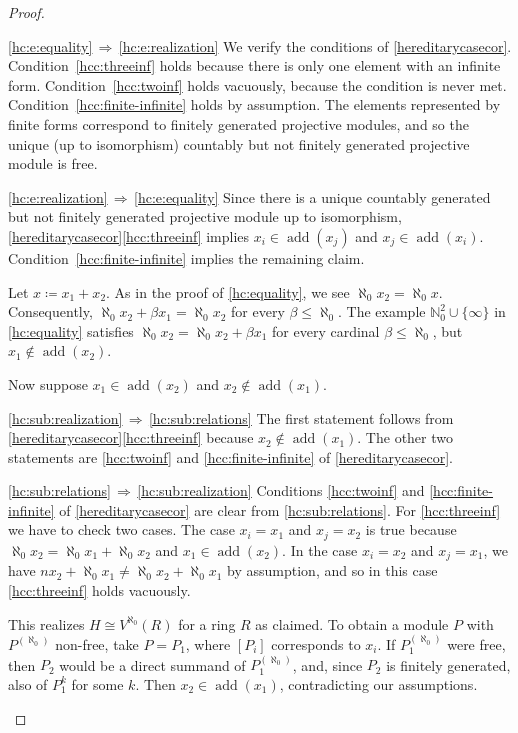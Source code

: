 \documentclass[a4paper,11pt,oneside]{amsart}
\theoremstyle{remark}
\DeclareMathOperator{\add}{add}
\newcommand{\bN}{\mathbb N}
\begin{document}
\begin{proof}
\begin{proofenumerate}
\ref{hc:e:equality}$\,\Rightarrow\,$\ref{hc:e:realization}
  We verify the conditions of \cref{hereditarycasecor}.
  Condition~\ref{hcc:threeinf} holds because there is only one element with an infinite form.
  Condition~\ref{hcc:twoinf} holds vacuously, because the condition is never met.
  Condition~\ref{hcc:finite-infinite} holds by assumption.
  The elements represented by finite forms correspond to finitely generated projective modules, and so the unique (up to isomorphism) countably but not finitely generated projective module is free.

  \ref{hc:e:realization}$\,\Rightarrow\,$\ref{hc:e:equality}
  Since there is a unique countably generated but not finitely generated projective module up to isomorphism, \cref{hereditarycasecor}\ref{hcc:threeinf} implies $x_i \in \add(x_j)$ and $x_j \in \add(x_i)$.
  Condition~\ref{hcc:finite-infinite} implies the remaining claim.

  \item[\ref{hc:inclusion}]
  Let $x \coloneqq x_1 + x_2$.
  As in the proof of \ref{hc:equality}, we see $\aleph_0 x_2 = \aleph_0 x$.
  Consequently, $\aleph_0 x_2 + \beta x_1 = \aleph_0 x_2$ for every $\beta \leq \aleph_0$.
  The example $\bN_0^2 \cup \{\infty\}$ in \ref{hc:equality} satisfies $\aleph_0 x_2 = \aleph_0 x_2 + \beta x_1$ for every cardinal $\beta \le \aleph_0$, but $x_1\notin \add(x_2)$.
  
  Now suppose $x_1\in \add(x_2)$ and  $x_2\notin \add(x_1)$.

  \ref{hc:sub:realization}$\,\Rightarrow\,$\ref{hc:sub:relations}
  The first statement follows from \cref{hereditarycasecor}\ref{hcc:threeinf} because $x_2 \not \in \add(x_1)$.
  The other two statements are \ref{hcc:twoinf} and \ref{hcc:finite-infinite} of \cref{hereditarycasecor}.

  \ref{hc:sub:relations}$\,\Rightarrow\,$\ref{hc:sub:realization}
  Conditions \ref{hcc:twoinf} and \ref{hcc:finite-infinite} of \cref{hereditarycasecor} are clear from \ref{hc:sub:relations}.
  For \ref{hcc:threeinf} we have to check two cases.
  The case $x_i=x_1$ and $x_j=x_2$ is true because $\aleph_0 x_2 = \aleph_0 x_1 + \aleph_0 x_2$ and $x_1 \in \add(x_2)$.
  In the case $x_i=x_2$ and $x_j=x_1$, we have $n x_2 + \aleph_0 x_1 \ne \aleph_0 x_2 + \aleph_0 x_1$ by assumption, and so in this case \ref{hcc:threeinf} holds vacuously.

  This realizes $H \cong V^{\aleph_0}(R)$ for a ring $R$ as claimed.
  To obtain a module $P$ with $P^{(\aleph_0)}$ non-free, take $P=P_1$, where $[P_i]$ corresponds to $x_i$.
  If $P_1^{(\aleph_0)}$ were free, then $P_2$ would be a direct summand of $P_1^{(\aleph_0)}$, and, since $P_2$ is finitely generated, also of $P_1^k$ for some $k$.
  Then $x_2 \in \add(x_1)$, contradicting our assumptions.


\end{proofenumerate}
\end{proof}
\end{document}
